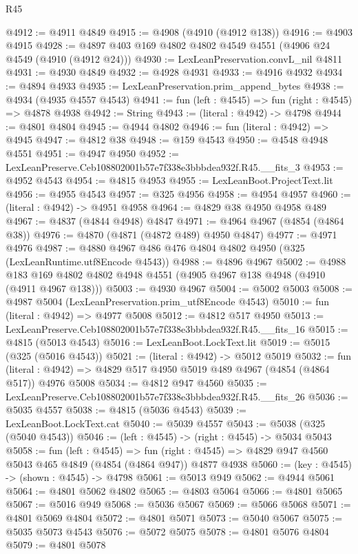 \begin{lexlean}{R45}
\begin{coremodule}
@4912 := @4911 @4849
@4915 := @4908 (@4910 (@4912 @138))
@4916 := @4903 @4915
@4928 := @4897 @403 @169 @4802 @4802 @4549 @4551 (@4906 @24 @4549 (@4910 (@4912 @24)))
@4930 := LexLeanPreservation.convL_nil @4811
@4931 := @4930 @4849
@4932 := @4928 @4931
@4933 := @4916 @4932
@4934 := @4894 @4933
@4935 := LexLeanPreservation.prim_append_bytes
@4938 := @4934 (@4935 @4557 @4543)
@4941 := fun (left : @4545) => fun (right : @4545) => @4878 @4938
@4942 := String
@4943 := (literal : @4942) -> @4798
@4944 := @4801 @4804
@4945 := @4944 @4802
@4946 := fun (literal : @4942) => @4945
@4947 := @4812 @38
@4948 := @159 @4543
@4950 := @4548 @4948 @4551
@4951 := @4947 @4950
@4952 := LexLeanPreserve.Ceb108802001b57e7f338e3bbbdea932f.R45.__fits_3
@4953 := @4952 @4543
@4954 := @4815 @4953
@4955 := LexLeanBoot.ProjectText.lit
@4956 := @4955 @4543
@4957 := @325 @4956
@4958 := @4954 @4957
@4960 := (literal : @4942) -> @4951 @4958
@4964 := @4829 @38 @4950 @4958 @489
@4967 := @4837 (@4844 @4948) @4847
@4971 := @4964 @4967 (@4854 (@4864 @38))
@4976 := @4870 (@4871 (@4872 @489) @4950 @4847)
@4977 := @4971 @4976
@4987 := @4880 @4967 @486 @476 @4804 @4802 @4950 (@325 (LexLeanRuntime.utf8Encode @4543))
@4988 := @4896 @4967
@5002 := @4988 @183 @169 @4802 @4802 @4948 @4551 (@4905 @4967 @138 @4948 (@4910 (@4911 @4967 @138)))
@5003 := @4930 @4967
@5004 := @5002 @5003
@5008 := @4987 @5004 (LexLeanPreservation.prim_utf8Encode @4543)
@5010 := fun (literal : @4942) => @4977 @5008
@5012 := @4812 @517 @4950
@5013 := LexLeanPreserve.Ceb108802001b57e7f338e3bbbdea932f.R45.__fits_16
@5015 := @4815 (@5013 @4543)
@5016 := LexLeanBoot.LockText.lit
@5019 := @5015 (@325 (@5016 @4543))
@5021 := (literal : @4942) -> @5012 @5019
@5032 := fun (literal : @4942) => @4829 @517 @4950 @5019 @489 @4967 (@4854 (@4864 @517)) @4976 @5008
@5034 := @4812 @947 @4560
@5035 := LexLeanPreserve.Ceb108802001b57e7f338e3bbbdea932f.R45.__fits_26
@5036 := @5035 @4557
@5038 := @4815 (@5036 @4543)
@5039 := LexLeanBoot.LockText.cat
@5040 := @5039 @4557
@5043 := @5038 (@325 (@5040 @4543))
@5046 := (left : @4545) -> (right : @4545) -> @5034 @5043
@5058 := fun (left : @4545) =>
  fun (right : @4545) => @4829 @947 @4560 @5043 @465 @4849 (@4854 (@4864 @947)) @4877 @4938
@5060 := (key : @4545) -> (shown : @4545) -> @4798
@5061 := @5013 @949
@5062 := @4944 @5061
@5064 := @4801 @5062 @4802
@5065 := @4803 @5064
@5066 := @4801 @5065
@5067 := @5016 @949
@5068 := @5036 @5067
@5069 := @5066 @5068
@5071 := @4801 @5069 @4804
@5072 := @4801 @5071
@5073 := @5040 @5067
@5075 := @5035 @5073 @4543
@5076 := @5072 @5075
@5078 := @4801 @5076 @4804
@5079 := @4801 @5078

\end{coremodule}
\end{lexlean}

